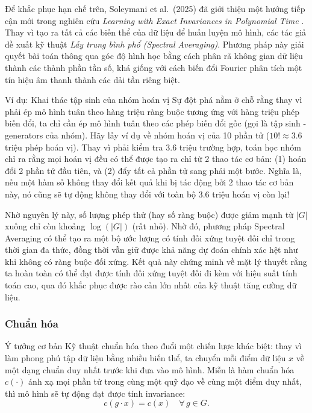 Để khắc phục hạn chế trên, Soleymani et al.\ (2025) đã giới thiệu một hướng tiếp cận mới trong nghiên cứu \textit{Learning with Exact Invariances in Polynomial Time} \cite{soleymani2025learning}. Thay vì tạo ra tất cả các biến thể của dữ liệu để huấn luyện mô hình, các tác giả đề xuất kỹ thuật \textit{Lấy trung bình phổ (Spectral Averaging)}. Phương pháp này giải quyết bài toán thông qua góc độ hình học bằng cách phân rã không gian dữ liệu thành các thành phần tần số, khá giống với cách biến đổi Fourier phân tích một tín hiệu âm thanh thành các dải tần riêng biệt.


\begin{examplebox}{Ví dụ: Khai thác tập sinh của nhóm hoán vị}
Sự đột phá nằm ở chỗ rằng thay vì phải ép mô hình tuân theo hàng triệu ràng buộc tương ứng với hàng triệu phép biến đổi, ta chỉ cần ép mô hình tuân theo các phép biến đổi gốc (gọi là tập sinh - generators của nhóm). Hãy lấy ví dụ về nhóm hoán vị của 10 phần tử ($10! \approx 3.6$ triệu phép hoán vị). Thay vì phải kiểm tra $3.6$ triệu trường hợp, toán học nhóm chỉ ra rằng mọi hoán vị đều có thể được tạo ra chỉ từ 2 thao tác cơ bản: (1) hoán đổi 2 phần tử đầu tiên, và (2) đẩy tất cả phần tử sang phải một bước. Nghĩa là, nếu một hàm số không thay đổi kết quả khi bị tác động bởi 2 thao tác cơ bản này, nó cũng sẽ tự động không thay đổi với toàn bộ $3.6$ triệu hoán vị còn lại!
\end{examplebox}

Nhờ nguyên lý này, số lượng phép thử (hay số ràng buộc) được giảm mạnh từ $|G|$ xuống chỉ còn khoảng $\log(|G|)$ (rất nhỏ). Nhờ đó, phương pháp Spectral Averaging có thể tạo ra một bộ ước lượng có tính đối xứng tuyệt đối chỉ trong thời gian đa thức, đồng thời vẫn giữ được khả năng dự đoán chính xác hệt như khi không có ràng buộc đối xứng. Kết quả này chứng minh về mặt lý thuyết rằng ta hoàn toàn có thể đạt được tính đối xứng tuyệt đối đi kèm với hiệu suất tính toán cao, qua đó khắc phục được rào cản lớn nhất của kỹ thuật tăng cường dữ liệu.


\subsubsection{Chuẩn hóa}
\label{subsubsec:canonicalization}

\begin{infobox}{Ý tưởng cơ bản}
Kỹ thuật chuẩn hóa theo đuổi một chiến lược khác biệt: thay vì làm phong phú tập dữ liệu bằng nhiều biến thể, ta chuyển mỗi điểm dữ liệu $x$ về một dạng chuẩn duy nhất trước khi đưa vào mô hình. Miễn là hàm chuẩn hóa $c(\cdot)$ ánh xạ mọi phần tử trong cùng một quỹ đạo về cùng một điểm duy nhất, thì mô hình sẽ tự động đạt được tính invariance:
\begin{equation}
    c(g \cdot x) = c(x) \quad \forall\, g \in G.
\end{equation}
\end{infobox}

